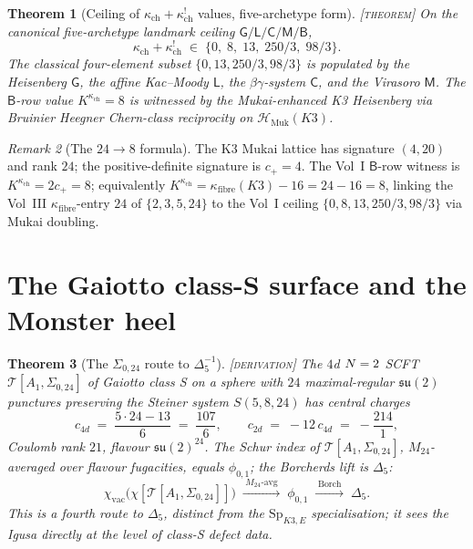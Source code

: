 \documentclass[11pt]{amsart}
\providecommand{\cH}{\mathcal{H}}
\providecommand{\cT}{\mathcal{T}}
\providecommand{\Sp}{\mathrm{Sp}}
\providecommand{\MUk}{\mathrm{Muk}}
\providecommand{\kch}{\kappa_{\mathrm{ch}}}
\providecommand{\kfib}{\kappa_{\mathrm{fibre}}}
\providecommand{\Mtf}{M_{24}}
\providecommand{\ClaimStatusTheorem}{\textsc{[theorem]}}
\providecommand{\ClaimStatusDerivation}{\textsc{[derivation]}}
\theoremstyle{plain}
\newtheorem{theorem}{Theorem}[section]
\theoremstyle{definition}
\theoremstyle{remark}
\newtheorem{remark}[theorem]{Remark}
\begin{document}
\begin{theorem}[Ceiling of $\kch+\kch^{!}$ values, five-archetype form]
\label{thm:ceiling-five}
\ClaimStatusTheorem{}\;
On the canonical five-archetype landmark ceiling
$\mathsf{G}/\mathsf{L}/\mathsf{C}/\mathsf{M}/\mathsf{B}$,
\[
\kch + \kch^{!} \;\in\; \{0,\; 8,\; 13,\; 250/3,\; 98/3\}.
\]
The classical four-element subset $\{0,13,250/3,98/3\}$ is populated
by the Heisenberg $\mathsf{G}$, the affine Kac--Moody $\mathsf{L}$, the
$\beta\gamma$-system $\mathsf{C}$, and the Virasoro $\mathsf{M}$. The
$\mathsf{B}$-row value $K^{\kch}=8$ is witnessed by the Mukai-enhanced
K3 Heisenberg via Bruinier Heegner Chern-class reciprocity on
$\cH_{\MUk}(K3)$.
\end{theorem}

\begin{remark}[The $24\to 8$ formula]
The K3 Mukai lattice has signature $(4,20)$ and rank $24$; the
positive-definite signature is $c_+=4$. The Vol~I
$\mathsf{B}$-row witness is
$K^{\kch}=2c_+=8$; equivalently
$K^{\kch}=\kfib(K3)-16=24-16=8$, linking the Vol~III
$\kfib$-entry $24$ of $\{2,3,5,24\}$ to the Vol~I ceiling $\{0,8,13,
250/3,98/3\}$ via Mukai doubling.
\end{remark}

\section{The Gaiotto class-S surface and the Monster heel}

\begin{theorem}[The $\Sigma_{0,24}$ route to $\Delta_5^{-1}$]
\label{thm:sigma-0-24}
\ClaimStatusDerivation{}\;
The $4$d $N=2$ SCFT $\cT[A_1,\Sigma_{0,24}]$ of Gaiotto class S
on a sphere with $24$ maximal-regular $\mathfrak{su}(2)$ punctures
preserving the Steiner system $S(5,8,24)$ has central charges
\[
c_{4d}\;=\;\frac{5\cdot 24-13}{6}\;=\;\frac{107}{6},
\qquad
c_{2d}\;=\;-12\,c_{4d}\;=\;-\frac{214}{1},
\]
Coulomb rank $21$, flavour $\mathfrak{su}(2)^{24}$. The Schur index of
$\cT[A_1,\Sigma_{0,24}]$, $\Mtf$-averaged over flavour fugacities,
equals $\phi_{0,1}$; the Borcherds lift is $\Delta_5$:
\[
\chi_{\mathrm{vac}}\bigl(\chi[\cT[A_1,\Sigma_{0,24}]]\bigr)
\;\xrightarrow{\;\Mtf\text{-avg}\;}\;\phi_{0,1}
\;\xrightarrow{\;\mathrm{Borch}\;}\;\Delta_5.
\]
This is a \emph{fourth} route to $\Delta_5$, distinct from the
$\Sp_{K3,E}$ specialisation; it sees the Igusa directly at the level
of class-S defect data.
\end{theorem}
\end{document}
